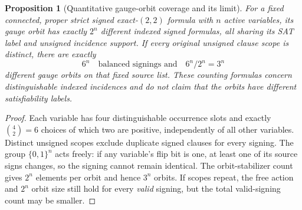 \documentclass[11pt]{article}
\newtheorem{proposition}[theorem]{Proposition}
\begin{document}
\begin{proposition}[Quantitative gauge-orbit coverage and its limit]\label{p:count}
For a fixed connected, proper strict signed exact-$(2,2)$ formula with $n$ active variables, its gauge orbit has \emph{exactly} $2^n$ different indexed signed formulas, all sharing its SAT label and unsigned incidence support. If every original unsigned clause scope is distinct, there are exactly
\[
6^n\quad\text{balanced signings and}\quad 6^n/2^n=3^n
\]
different gauge orbits on that fixed source list. These counting formulas concern distinguishable indexed incidences and do not claim that the orbits have different satisfiability labels.
\end{proposition}
\begin{proof}
Each variable has four distinguishable occurrence slots and exactly $\binom42=6$ choices of which two are positive, independently of all other variables. Distinct unsigned scopes exclude duplicate signed clauses for every signing. The group $\{0,1\}^n$ acts freely: if any variable's flip bit is one, at least one of its source signs changes, so the signing cannot remain identical. The orbit-stabilizer count gives $2^n$ elements per orbit and hence $3^n$ orbits. If scopes repeat, the free action and $2^n$ orbit size still hold for every \emph{valid} signing, but the total valid-signing count may be smaller.
\end{proof}
\end{document}
